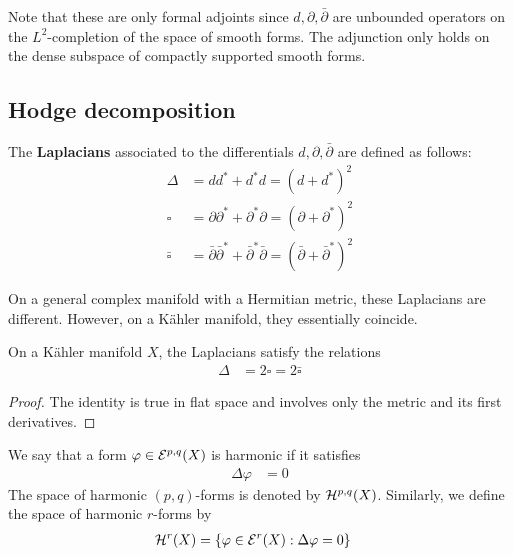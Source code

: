 \documentclass[12pt]{article}
\begin{document}
\begin{remark}
    Note that these are only formal adjoints since $d, \partial, \bar{\partial}$ are unbounded operators on the $L^2$-completion of the space of smooth forms. The adjunction only holds on the dense subspace of compactly supported smooth forms.
\end{remark}
\subsection{Hodge decomposition}
\begin{definition}
    The \textbf{Laplacians} associated to the differentials $d, \partial, \bar{\partial}$ are defined as follows:
    \begin{align*}
        \Delta & = d d^* + d^* d = (d + d^*)^2 \\
        \square & = \partial \partial^* + \partial^* \partial = (\partial + \partial^*)^2 \\
        \bar\square & = \bar{\partial} \bar{\partial}^* + \bar{\partial}^* \bar{\partial} = (\bar{\partial} + \bar{\partial}^*)^2 
    \end{align*}
\end{definition}

On a general complex manifold with a Hermitian metric, these Laplacians are different. However, on a K\"ahler manifold, they essentially coincide. 

\begin{theorem}
    On a K\"ahler manifold $X$, the Laplacians satisfy the relations \begin{align*}
        \Delta & = 2 \square = 2 \bar\square
        \end{align*} 
\end{theorem}
\begin{proof}
    The identity is true in flat space and involves only the metric and its first derivatives.
\end{proof}

\begin{definition}
    We say that a form $\varphi \in {\mathcal{E}}^{p,q}(X)$ is harmonic if it satisfies \begin{align*}
        \Delta \varphi & = 0
    \end{align*} The space of harmonic $(p,q)$-forms is denoted by ${\mathcal{H}}^{p,q}(X)$. Similarly, we define the space of harmonic $r$-forms by \begin{align*}
        {\mathcal{H}}^r(X) & = \{ \varphi \in {\mathcal{E}}^r(X) : \Delta \varphi = 0 \}
    \end{align*}
\end{definition}
\end{document}
